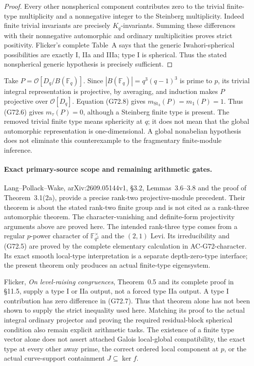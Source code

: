 \begin{proof}
Every other nonspherical component contributes zero to the
trivial finite-type multiplicity and a nonnegative integer to
the Steinberg multiplicity.  Indeed finite trivial invariants
are precisely \(K_q\)-invariants.  Summing these differences
with their nonnegative automorphic and ordinary multiplicities
proves strict positivity.  Flicker's complete Table~A says
that the generic Iwahori-spherical possibilities are exactly
I, IIa and IIIa; type I is spherical.  Thus the stated
nonspherical generic hypothesis is precisely sufficient.
\end{proof}

\begin{remark}
Take \(P=\mathcal O[D_q/B(\mathbb F_q)]\).  Since
\(|B(\mathbb F_q)|=q^3(q-1)^3\) is prime to \(p\), its
trivial integral representation is projective, by averaging,
and induction makes \(P\) projective over \(\mathcal O[D_q]\).
Equation (G72.8) gives \(m_{\mathrm{St}_3}(P)=m_1(P)=1\).
Thus (G72.6) gives \(m_\tau(P)=0\), although a Steinberg
finite type is present.  The removed trivial finite type means
sphericity at \(q\); it does not mean that the global
automorphic representation is one-dimensional.  A global
nonabelian hypothesis does not eliminate this counterexample
to the fragmentary finite-module inference.
\end{remark}

\paragraph{Exact primary-source scope and remaining arithmetic gates.}
Lang--Pollack--Wake, arXiv:2609.05144v1, \S3.2, Lemmas~3.6--3.8
and the proof of Theorem~3.1(2a), provide a precise rank-two
projective-module precedent.  Their theorem is about the stated
rank-two finite group and is not cited as a rank-three
automorphic theorem.  The character-vanishing and definite-form
projectivity arguments above are proved here.  The intended
rank-three type comes from a regular \(p\)-power character of
\(\mathbb F_{q^2}^{\times}\) and the \((2,1)\) Levi.
Its irreducibility and (G72.5) are proved by the complete elementary
calculation in AC-G72-character.  Its exact smooth local-type
interpretation is a separate depth-zero-type interface; the
present theorem only produces an actual finite-type eigensystem.

Flicker, \emph{On level-raising congruences}, Theorem~0.5 and
its complete proof in \S11.5, supply a type I or IIa output,
not a forced type IIa output.  A type I contribution has
zero difference in (G72.7).  Thus that theorem alone has not
been shown to supply the strict inequality used here.
Matching its proof to the actual integral ordinary projector
and proving the required residual-block spherical condition
also remain explicit arithmetic tasks.  The existence of a
finite type vector alone does not assert attached Galois
local-global compatibility, the exact type at every other
away prime, the correct ordered local component at \(p\),
or the actual curve-support containment \(J\subseteq\ker f\).

